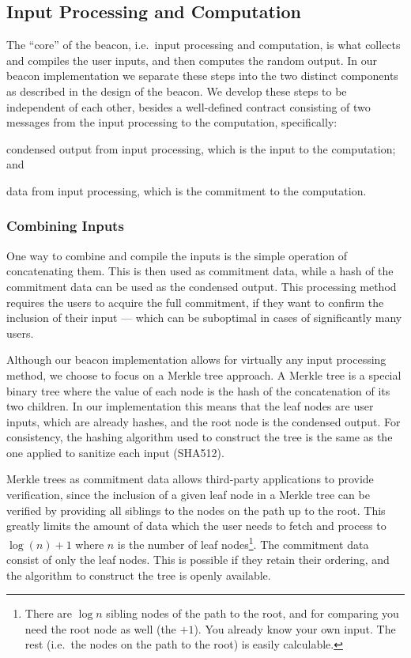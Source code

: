 \subsection{Input Processing and Computation}%
\label{sub:input_processing_and_computation}
The \enquote{core} of the beacon, i.e.\ input processing and computation, is what collects and compiles the user inputs, and then computes the random output.
In our beacon implementation we separate these steps into the two distinct components as described in the design of the beacon.
We develop these steps to be independent of each other, besides a well-defined contract consisting of two messages from the input processing to the computation, specifically:
\begin{eletterate*}
\item condensed output from input processing, which is the input to the computation; and
\item data from input processing, which is the commitment to the computation.
\end{eletterate*}

\subsubsection{Combining Inputs}%
\label{ssub:combining_inputs}
One way to combine and compile the inputs is the simple operation of concatenating them.
This is then used as commitment data, while a hash of the commitment data can be used as the condensed output.
This processing method requires the users to acquire the full commitment, if they want to confirm the inclusion of their input --- which can be suboptimal in cases of significantly many users.

Although our beacon implementation allows for virtually any input processing method, we choose to focus on a Merkle tree approach.
 A Merkle tree is a special binary tree where the value of each node is the hash of the concatenation of its two children.
In our implementation this means that the leaf nodes are user inputs, which are already hashes, and the root node is the condensed output.
For consistency, the hashing algorithm used to construct the tree is the same as the one applied to sanitize each input (SHA512).

Merkle trees as commitment data allows third-party applications to provide verification, since the inclusion of a given leaf node in a Merkle tree can be verified by providing all siblings to the nodes on the path up to the root.
This greatly limits the amount of data which the user needs to fetch and process to $\log{(n)}+1$ where $n$ is the number of leaf nodes\footnote{There are $\log{n}$ sibling nodes of the path to the root, and for comparing you need the root node as well (the $+1$). You already know your own input. The rest (i.e.\ the nodes on the path to the root) is easily calculable.}.
The commitment data consist of only the leaf nodes.
This is possible if they retain their ordering, and the algorithm to construct the tree is openly available.

